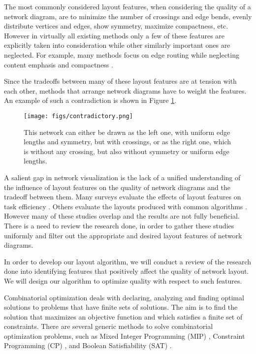\documentclass[a4paper,11pt,phdthesis,singlespace,twoside]{cssethesis}
\begin{document}
The most commonly considered layout features, when considering the quality of a network diagram, are to minimize the number of crossings and edge bends, evenly distribute vertices and edges, show symmetry, maximize compactness, etc. However in virtually all existing methods only a few of these features are explicitly taken into consideration while other similarly important ones are neglected. For example, many methods focus on edge routing while neglecting content emphasis and compactness \cite{Yoghourdjian2015high}.

Since the tradeoffs between many of these layout features are at tension with each other, methods that arrange network diagrams have to weight the features. An example of such a contradiction is shown in Figure \ref{fig:contradictory}.

\begin{figure}[H]
\begin{center}
\texttt{[image: figs/contradictory.png]}
\end{center}
\caption{This network can either be drawn as the left one, with uniform edge lengths and symmetry, but with crossings, or as the right one, which is without any crossing, but also without symmetry or uniform edge lengths.}
\label{fig:contradictory}
\end{figure}

		A salient gap in network visualization is the lack of a unified understanding of the influence of layout features on the quality of network diagrams and the tradeoff between them. Many surveys evaluate the effects of layout features on task efficiency \cite{purchase1996validating}\cite{purchase2002metrics}. Others evaluate the layouts produced with common algorithms \cite{himsolt1995comparing}\cite{purchase1998performance}. However many of these studies overlap and the results are not fully beneficial. There is a need to review the research done, in order to gather these studies uniformly and filter out the appropriate and desired layout features of network diagrams.
		
		In order to develop our layout algorithm, we will conduct a review of the research done into identifying features that positively affect the quality of network layout. We will design our algorithm to optimize quality with respect to such features.
		
Combinatorial optimization deals with declaring, analyzing and finding optimal solutions to problems that have finite sets of solutions. The aim is to find the solution that maximizes an objective function and which satisfies a finite set of constraints. There are several generic methods to solve combinatorial optimization problems, such as Mixed Integer Programming (MIP) \cite{MILPcom}, Constraint Programming (CP) \cite{CPcom}, and Boolean Satisfiability (SAT) \cite{middendorf2013evolutionary}.
\end{document}
